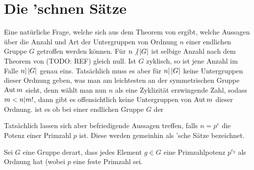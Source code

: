 \documentclass{article}
\begin{document}
\section{Die 'schnen Sätze}

Eine natürliche Frage, welche sich aus dem Theorem von  ergibt, welche Aussagen über die Anzahl und Art der
Untergruppen von Ordnung $n$ einer endlichen Gruppe $G$ getroffen werden können.
Für $n\not| \left\vert{G}\right\vert$ ist selbige Anzahl nach dem Theorem von  (TODO: REF) gleich null. Ist $G$ zyklisch, so
ist jene Anzahl im Falle $n| \left\vert{G}\right\vert$ genau eins. Tatsächlich muss es aber für $n| \left\vert{G}\right\vert$ keine Untergruppen dieser
Ordnung geben, was man am leichtesten an der symmetrischen Gruppe $\mathop{\mathrm{Aut}}\nolimits m$ sieht, denn wählt man nun $n$ als eine Zyklizität
erzwingende Zahl, sodass $m<n| m!$, dann gibt es offensichtlich keine Untergruppen von $\mathop{\mathrm{Aut}}\nolimits m$ dieser Ordnung.
ist es ob bei einer endlichen Gruppe $G$ der

Tatsächlich lassen sich aber befriedigende Aussagen treffen, falls $n=p^e$ die Potenz einer Primzahl $p$ ist. Diese werden
gemeinhin als 'sche Sätze bezeichnet.

\begin{definition}[$p$-Gruppe]
    Sei $G$ eine Gruppe derart, dass jedes Element $g\in G$ eine Primzahlpotenz $p^{e_g}$ als Ordnung hat (wobei $p$ eine feste
    Primzahl sei.
\end{definition}
\end{document}
